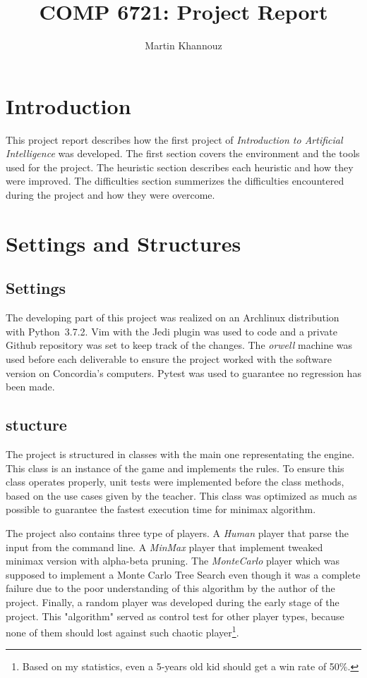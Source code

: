 \documentclass[runningheads]{llncs}
\begin{document}
%
\title{COMP 6721: Project Report}
\author{Martin Khannouz}
%
%
\maketitle              %
%
\section*{Introduction}
This project report describes how the first
project of \textit{Introduction to Artificial
Intelligence} was developed. The first section
covers the environment and the tools used for the
project. The heuristic section describes each
heuristic and how they were improved. The
difficulties section summerizes the difficulties
encountered during the project and how they were
overcome.

\section{Settings and Structures}
\subsection{Settings}
The developing part of this project was realized
on an Archlinux distribution with Python~3.7.2.
Vim with the Jedi plugin was used to code and a private Github repository was set to
keep track of the changes.
The \textit{orwell} machine was used before each
deliverable to ensure the project worked with the
software version on Concordia's computers. Pytest
was used to guarantee no regression has been made.

\subsection{stucture}
The project is structured in classes with
the main one representating the engine. This class is an
instance of the game and implements the rules.
To ensure this class operates properly, unit tests
were implemented before the class methods, based on
the use cases given by the teacher.
This class was optimized as much as possible to
guarantee the fastest execution time for minimax
algorithm.

The project also contains three type of players. A
\textit{Human} player that parse the input from the command
line. A \textit{MinMax} player that implement tweaked
minimax version with alpha-beta pruning. The
\textit{MonteCarlo} player which was supposed to implement
a Monte Carlo Tree Search even though it was a
complete failure due to the poor understanding of
this algorithm by the author of the project. Finally, a random player was
developed during the early stage of the project.
This "algorithm" served as control test for other
player types, because none of them should lost
against such chaotic player\footnote{Based on my
statistics, even a 5-years old kid should get a
win rate of 50\%.}.
\end{document}
